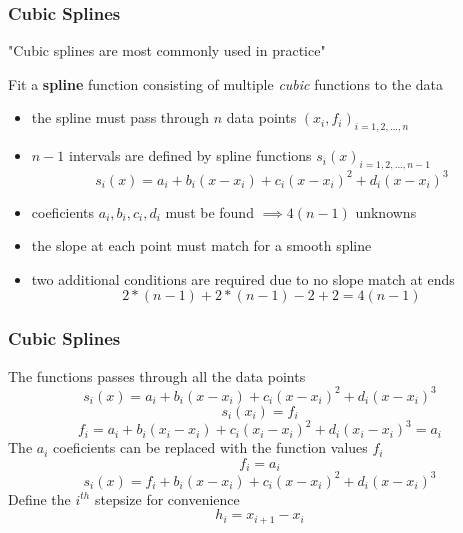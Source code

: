\documentclass[fleqn]{beamer} %
\newcommand{\sectionIIIsubsectionIVtitle}{Cubic Splines}
\begin{document}
			\begin{frame}
				\frametitle{\sectionIIIsubsectionIVtitle}
				\bigskip
        
        "Cubic splines are most commonly used in practice" \vspcc
          
        Fit a {\bf spline} function consisting of multiple {\it cubic} functions to the data
       
        \begin{itemize}
          \item the spline must pass through $n$ data points $\left(x_i,f_i \right)_{i=1,2,...,n}$ 
          \item $n-1$ intervals are defined by spline functions $s_i(x)_{i=1,2,...,n-1}$
          \[s_i\left(x\right)=a_i+b_i\left(x-x_i\right)+c_i\left(x-x_i\right)^2+d_i\left(x-x_i\right)^3\]
          \item coeficients $a_i,b_i,c_i,d_i$ must be found $\implies 4\left(n-1\right)$ unknowns 
          \item the slope at each point must match for a smooth spline  
          \item two additional conditions are required due to no slope match at ends
          \[2*\left(n-1\right)+2*\left(n-1\right)-2+2=4\left(n-1\right)\]
       \end{itemize}            
 
				\btVFill
			\end{frame}	

			\begin{frame}
				\frametitle{\sectionIIIsubsectionIVtitle} 
				\bigskip

        The functions passes through all the data points
        \[s_i\left(x\right)=a_i+b_i\left(x-x_i\right)+c_i\left(x-x_i\right)^2+d_i\left(x-x_i\right)^3\]
        \[s_i\left(x_i\right)=f_i\]       
        \[f_i=a_i+b_i\left(x_i-x_i\right)+c_i\left(x_i-x_i\right)^2+d_i\left(x_i-x_i\right)^3=a_i\]
        The $a_i$ coeficients can be replaced with the function values $f_i$
        \[f_i=a_i\]
        \[s_i\left(x\right)=f_i+b_i\left(x-x_i\right)+c_i\left(x-x_i\right)^2+d_i\left(x-x_i\right)^3\]
        Define the $i^{th}$ stepsize for convenience
        \[h_i=x_{i+1}-x_i\]
        \btVFill
			\end{frame}	
\end{document}
